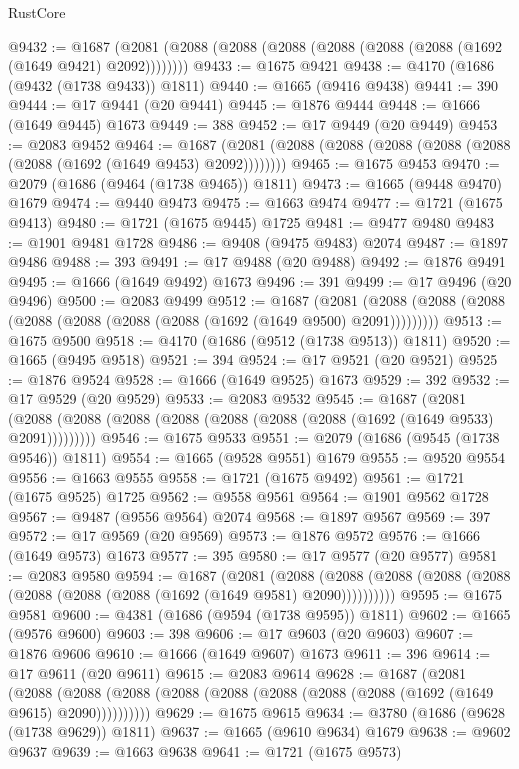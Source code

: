 \begin{lexlean}{RustCore}
\begin{coremodule}
@9432 := @1687 (@2081 (@2088 (@2088 (@2088 (@2088 (@2088 (@2088 (@1692 (@1649 @9421) @2092))))))))
@9433 := @1675 @9421
@9438 := @4170 (@1686 (@9432 (@1738 @9433)) @1811)
@9440 := @1665 (@9416 @9438)
@9441 := 390
@9444 := @17 @9441 (@20 @9441)
@9445 := @1876 @9444
@9448 := @1666 (@1649 @9445) @1673
@9449 := 388
@9452 := @17 @9449 (@20 @9449)
@9453 := @2083 @9452
@9464 := @1687 (@2081 (@2088 (@2088 (@2088 (@2088 (@2088 (@2088 (@1692 (@1649 @9453) @2092))))))))
@9465 := @1675 @9453
@9470 := @2079 (@1686 (@9464 (@1738 @9465)) @1811)
@9473 := @1665 (@9448 @9470) @1679
@9474 := @9440 @9473
@9475 := @1663 @9474
@9477 := @1721 (@1675 @9413)
@9480 := @1721 (@1675 @9445) @1725
@9481 := @9477 @9480
@9483 := @1901 @9481 @1728
@9486 := @9408 (@9475 @9483) @2074
@9487 := @1897 @9486
@9488 := 393
@9491 := @17 @9488 (@20 @9488)
@9492 := @1876 @9491
@9495 := @1666 (@1649 @9492) @1673
@9496 := 391
@9499 := @17 @9496 (@20 @9496)
@9500 := @2083 @9499
@9512 := @1687
    (@2081 (@2088 (@2088 (@2088 (@2088 (@2088 (@2088 (@2088 (@1692 (@1649 @9500) @2091)))))))))
@9513 := @1675 @9500
@9518 := @4170 (@1686 (@9512 (@1738 @9513)) @1811)
@9520 := @1665 (@9495 @9518)
@9521 := 394
@9524 := @17 @9521 (@20 @9521)
@9525 := @1876 @9524
@9528 := @1666 (@1649 @9525) @1673
@9529 := 392
@9532 := @17 @9529 (@20 @9529)
@9533 := @2083 @9532
@9545 := @1687
    (@2081 (@2088 (@2088 (@2088 (@2088 (@2088 (@2088 (@2088 (@1692 (@1649 @9533) @2091)))))))))
@9546 := @1675 @9533
@9551 := @2079 (@1686 (@9545 (@1738 @9546)) @1811)
@9554 := @1665 (@9528 @9551) @1679
@9555 := @9520 @9554
@9556 := @1663 @9555
@9558 := @1721 (@1675 @9492)
@9561 := @1721 (@1675 @9525) @1725
@9562 := @9558 @9561
@9564 := @1901 @9562 @1728
@9567 := @9487 (@9556 @9564) @2074
@9568 := @1897 @9567
@9569 := 397
@9572 := @17 @9569 (@20 @9569)
@9573 := @1876 @9572
@9576 := @1666 (@1649 @9573) @1673
@9577 := 395
@9580 := @17 @9577 (@20 @9577)
@9581 := @2083 @9580
@9594 := @1687
    (@2081
      (@2088 (@2088 (@2088 (@2088 (@2088 (@2088 (@2088 (@2088 (@1692 (@1649 @9581) @2090))))))))))
@9595 := @1675 @9581
@9600 := @4381 (@1686 (@9594 (@1738 @9595)) @1811)
@9602 := @1665 (@9576 @9600)
@9603 := 398
@9606 := @17 @9603 (@20 @9603)
@9607 := @1876 @9606
@9610 := @1666 (@1649 @9607) @1673
@9611 := 396
@9614 := @17 @9611 (@20 @9611)
@9615 := @2083 @9614
@9628 := @1687
    (@2081
      (@2088 (@2088 (@2088 (@2088 (@2088 (@2088 (@2088 (@2088 (@1692 (@1649 @9615) @2090))))))))))
@9629 := @1675 @9615
@9634 := @3780 (@1686 (@9628 (@1738 @9629)) @1811)
@9637 := @1665 (@9610 @9634) @1679
@9638 := @9602 @9637
@9639 := @1663 @9638
@9641 := @1721 (@1675 @9573)

\end{coremodule}
\end{lexlean}

